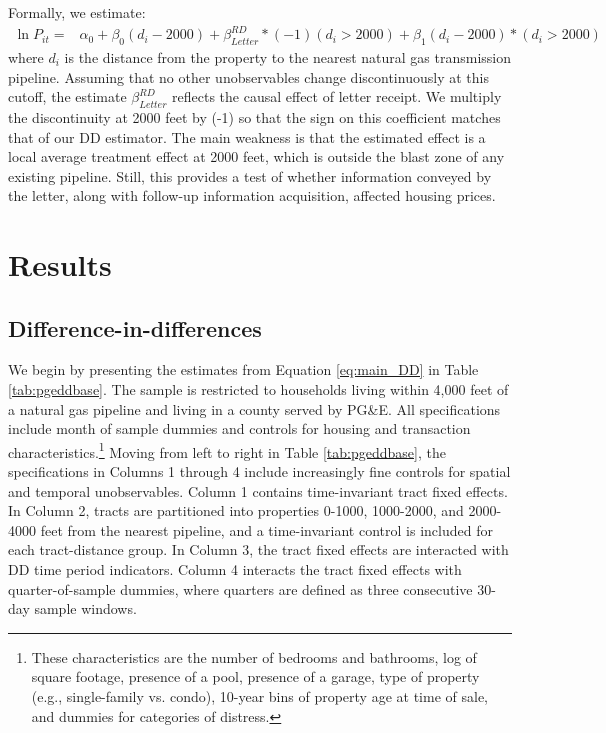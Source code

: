 \documentclass[12pt]{article}
\begin{document}
Formally, we estimate:
\begin{align}
\ln P_{it}= & \alpha_{0}+\beta_{0}(d_{i}-2000)+\beta_{Letter}^{RD}*(-1)(d_{i}>2000)+\beta_{1}(d_{i}-2000)*(d_{i}>2000)\label{eq:rdd}
\end{align}
where $d_{i}$ is the distance from the property to the nearest natural gas transmission pipeline. Assuming that no other unobservables change discontinuously at this cutoff, the estimate $\beta_{Letter}^{RD}$ reflects the causal effect of letter receipt. We multiply the discontinuity at 2000 feet by (-1) so that the sign on this coefficient matches that of our DD estimator. The main weakness is that the estimated effect is a local average treatment effect at 2000 feet, which is outside the blast zone of any existing pipeline. Still, this provides a test of whether information conveyed by the letter, along with follow-up information acquisition, affected housing prices. 

\section{Results \label{sec:Results}}

\subsection{Difference-in-differences}

We begin by presenting the estimates from Equation \ref{eq:main_DD} in Table \ref{tab:pgeddbase}. The sample is restricted to households living within 4,000 feet of a natural gas pipeline and living in a county served by PG\&E. All specifications include month of sample dummies and controls for housing and transaction characteristics.\footnote{These characteristics are the number of bedrooms and bathrooms, log of square footage, presence of a pool, presence of a garage, type of property (e.g., single-family vs. condo), 10-year bins of property age at time of sale, and dummies for categories of distress.} Moving from left to right in Table \ref{tab:pgeddbase}, the specifications in Columns 1 through 4 include increasingly fine controls for spatial and temporal unobservables. Column 1 contains time-invariant tract fixed effects. In Column 2, tracts are partitioned into properties 0-1000, 1000-2000, and 2000-4000 feet from the nearest pipeline, and a time-invariant control is included for each tract-distance group. In Column 3, the tract fixed effects are interacted with DD time period indicators. Column 4 interacts the tract fixed effects with quarter-of-sample dummies, where quarters are defined as three consecutive 30-day sample windows.
\end{document}
